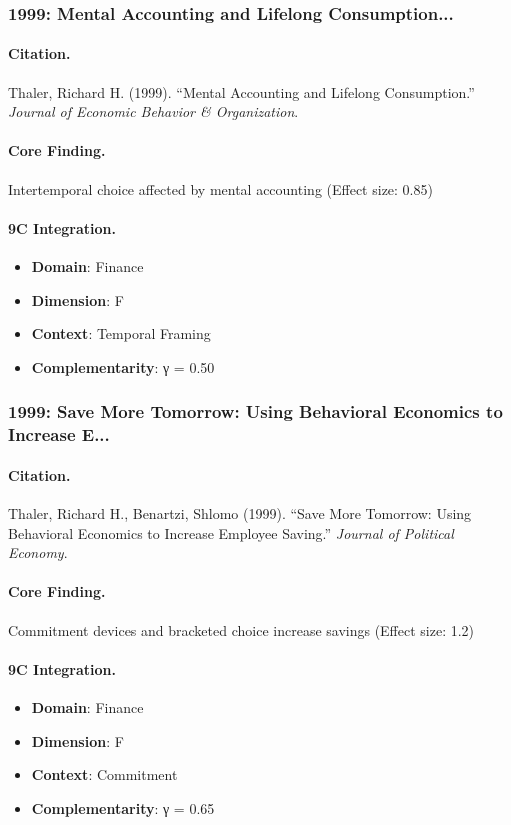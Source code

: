 \subsubsection{1999: Mental Accounting and Lifelong Consumption...}

\paragraph{Citation.}
Thaler, Richard H. (1999). ``Mental Accounting and Lifelong Consumption.''
\textit{Journal of Economic Behavior & Organization}.

\paragraph{Core Finding.}
Intertemporal choice affected by mental accounting (Effect size: 0.85)

\paragraph{9C Integration.}
\begin{itemize}[nosep]
  \item \textbf{Domain}: Finance
  \item \textbf{Dimension}: F
  \item \textbf{Context}: Temporal Framing
  \item \textbf{Complementarity}: γ = 0.50
\end{itemize}

\subsubsection{1999: Save More Tomorrow: Using Behavioral Economics to Increase E...}

\paragraph{Citation.}
Thaler, Richard H., Benartzi, Shlomo (1999). ``Save More Tomorrow: Using Behavioral Economics to Increase Employee Saving.''
\textit{Journal of Political Economy}.

\paragraph{Core Finding.}
Commitment devices and bracketed choice increase savings (Effect size: 1.2)

\paragraph{9C Integration.}
\begin{itemize}[nosep]
  \item \textbf{Domain}: Finance
  \item \textbf{Dimension}: F
  \item \textbf{Context}: Commitment
  \item \textbf{Complementarity}: γ = 0.65
\end{itemize}

